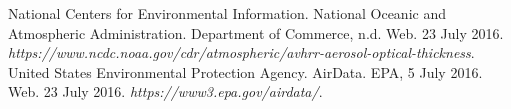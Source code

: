 \documentclass[10pt]{article}
\begin{document}
\begin{thebibliography}{99}

 National Centers for Environmental Information. National Oceanic and Atmospheric Administration. Department of Commerce, n.d. Web. 23 July 2016. \textit{https://www.ncdc.noaa.gov/cdr/atmospheric/avhrr-aerosol-optical-thickness}.
 United States Environmental Protection Agency. AirData. EPA, 5 July 2016. Web. 23 July 2016. \textit{https://www3.epa.gov/airdata/}.


\end{thebibliography}
\end{document}
